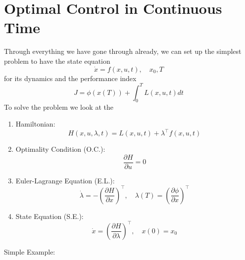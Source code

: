 \documentclass{article}
\begin{document}
\section{Optimal Control in Continuous Time}

Through everything we have gone through already, we can set up the simplest problem to have
the state equation
\[\dot{x} = f(x,u,t),\quad x_0, T\]
for its dynamics and the performance index
\[J = \phi(x(T)) + \int_{0}^{T}L(x,u,t)dt\]
To solve the problem we look at the
\begin{enumerate}
    \item Hamiltonian: \[H(x,u,\lambda,t) = L(x,u,t) + \lambda^\top f(x,u,t)\]
    \item Optimality Condition (O.C.): \[\frac{\partial H}{\partial u} = 0\]
    \item Euler-Lagrange Equation (E.L.):
    \[\dot{\lambda} = -\left(\frac{\partial H}{\partial x}\right)^\top,
    \quad\lambda(T) = \left(\frac{\partial\phi}{\partial x}\right)^\top\]
    \item State Equation (S.E.):
    \[\dot{x} = \left(\frac{\partial H}{\partial \lambda}\right)^\top, \quad x(0) = x_0\]
\end{enumerate}
Simple Example:
\end{document}
